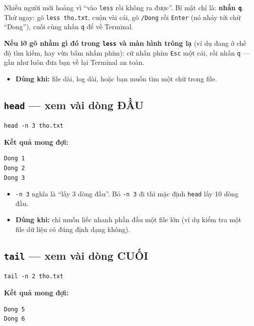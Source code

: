 \documentclass[12pt,a4paper]{article}
\newcommand{\cmd}[1]{\texttt{#1}}
\begin{document}
\begin{notebox}[title={Trấn an}]
Nhiều người mới hoảng vì ``vào \cmd{less} rồi không ra được''. Bí mật chỉ là: \textbf{nhấn \cmd{q}}. Thử ngay: gõ \cmd{less tho.txt}, cuộn vài cái, gõ \cmd{/Dong} rồi \cmd{Enter} (nó nhảy tới chữ ``Dong''), cuối cùng nhấn \cmd{q} để về Terminal.

\vspace{0.5em}
\textbf{Nếu lỡ gõ nhầm gì đó trong \cmd{less} và màn hình trông lạ} (ví dụ đang ở chế độ tìm kiếm, hay vừa bấm nhầm phím): cứ nhấn phím \cmd{Esc} một cái, rồi nhấn \cmd{q} --- gần như luôn đưa bạn về lại Terminal an toàn.
\end{notebox}

\begin{itemize}[leftmargin=1.4em]
\item \textbf{Dùng khi:} file dài, log dài, hoặc bạn muốn tìm một chữ trong file.
\end{itemize}

\subsection{\texttt{head} --- xem vài dòng ĐẦU}

\begin{Verbatim}
head -n 3 tho.txt
\end{Verbatim}

\textbf{Kết quả mong đợi:}
\begin{Verbatim}
Dong 1
Dong 2
Dong 3
\end{Verbatim}

\begin{itemize}[leftmargin=1.4em]
\item \cmd{-n 3} nghĩa là ``lấy 3 dòng đầu''. Bỏ \cmd{-n 3} đi thì mặc định \cmd{head} lấy 10 dòng đầu.
\item \textbf{Dùng khi:} chỉ muốn liếc nhanh phần đầu một file lớn (ví dụ kiểm tra một file dữ liệu có đúng định dạng không).
\end{itemize}

\subsection{\texttt{tail} --- xem vài dòng CUỐI}

\begin{Verbatim}
tail -n 2 tho.txt
\end{Verbatim}

\textbf{Kết quả mong đợi:}
\begin{Verbatim}
Dong 5
Dong 6
\end{Verbatim}
\end{document}
